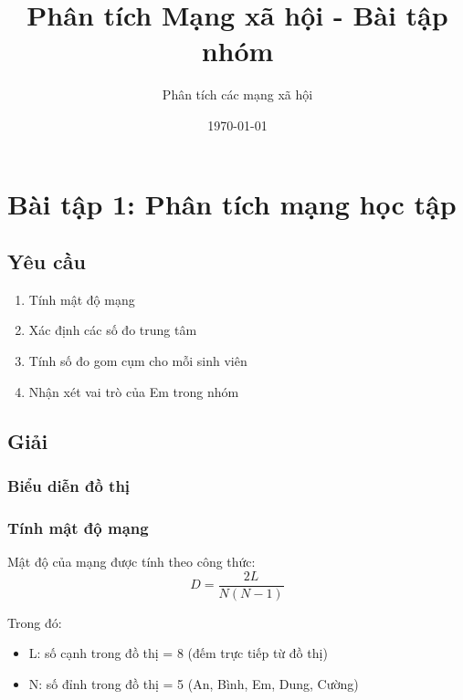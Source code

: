 \documentclass[12pt,a4paper]{article}
\title{Phân tích Mạng xã hội - Bài tập nhóm}
\author{Phân tích các mạng xã hội}
\date{\today}
\begin{document}
\maketitle
\tableofcontents
\newpage

\section{Bài tập 1: Phân tích mạng học tập}

\subsection{Yêu cầu}
\begin{enumerate}
\item Tính mật độ mạng
\item Xác định các số đo trung tâm
\item Tính số đo gom cụm cho mỗi sinh viên
\item Nhận xét vai trò của Em trong nhóm
\end{enumerate}

\subsection{Giải}

\subsubsection{Biểu diễn đồ thị}
\begin{center}
\end{center}

\subsubsection{Tính mật độ mạng}
Mật độ của mạng được tính theo công thức:
\[ D = \frac{2L}{N(N-1)} \]

Trong đó:
\begin{itemize}
\item L: số cạnh trong đồ thị = 8 (đếm trực tiếp từ đồ thị)
\item N: số đỉnh trong đồ thị = 5 (An, Bình, Em, Dung, Cường)
\end{itemize}
\end{document}
